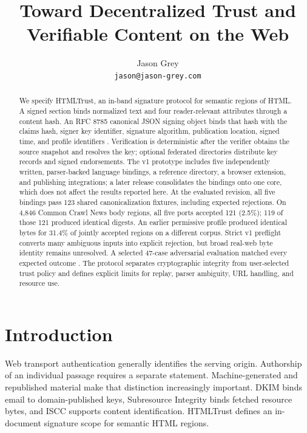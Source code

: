 \documentclass{article}
\title{Toward Decentralized Trust and Verifiable Content on the Web}
\author{
  Jason Grey\\
  \texttt{jason@jason-grey.com}
}
\date{}
\begin{document}
\maketitle

\begin{abstract}
We specify HTMLTrust, an in-band signature protocol for semantic regions of HTML. A signed section binds normalized text and four reader-relevant attributes through a content hash. An RFC 8785 canonical JSON signing object binds that hash with the claims hash, signer key identifier, signature algorithm, publication location, signed time, and profile identifiers \cite{HTMLTrustDraft}. Verification is deterministic after the verifier obtains the source snapshot and resolves the key; optional federated directories distribute key records and signed endorsements. The v1 prototype includes five independently written, parser-backed language bindings, a reference directory, a browser extension, and publishing integrations; a later release consolidates the bindings onto one core, which does not affect the results reported here. At the evaluated revision, all five bindings pass 123 shared canonicalization fixtures, including expected rejections. On 4{,}846 Common Crawl News body regions, all five ports accepted 121 (2.5\%); 119 of those 121 produced identical digests. An earlier permissive profile produced identical bytes for 31.4\% of jointly accepted regions on a different corpus. Strict v1 preflight converts many ambiguous inputs into explicit rejection, but broad real-web byte identity remains unresolved. A selected 47-case adversarial evaluation matched every expected outcome \cite{HTMLTrustCanon,HTMLTrustStudy1}. The protocol separates cryptographic integrity from user-selected trust policy and defines explicit limits for replay, parser ambiguity, URL handling, and resource use.
\end{abstract}

\section{Introduction}

Web transport authentication generally identifies the serving origin. Authorship of an individual passage requires a separate statement. Machine-generated and republished material make that distinction increasingly important. DKIM \cite{DKIM} binds email to domain-published keys, Subresource Integrity \cite{SRI} binds fetched resource bytes, and ISCC \cite{ISCC} supports content identification. HTMLTrust defines an in-document signature scope for semantic HTML regions.
\end{document}
